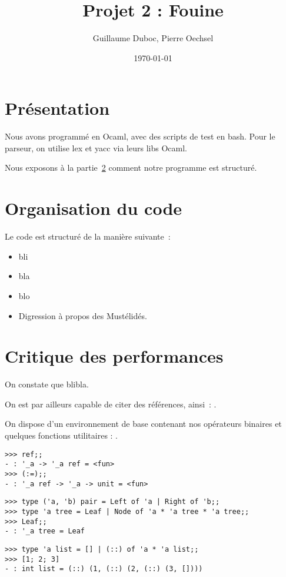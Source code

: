 \documentclass[paper=a4, fontsize=11pt, twocolumn]{article}
\title{Projet 2 : Fouine}
\author{Guillaume Duboc, Pierre Oechsel}
\date{\today}
\begin{document}
\maketitle


\section{Présentation}

Nous avons programmé en Ocaml, avec des scripts de test en bash.
Pour le parseur, on utilise lex et yacc via leurs libs Ocaml.

Nous exposons à la partie~\ref{s:orga} comment notre programme est structuré.


\section{Organisation du code}
\label{s:orga}

Le code est structuré de la manière suivante~:
\begin{itemize}
\item bli
\item bla
\item blo
\item Digression à propos des Mustélidés.
\end{itemize}

\section{Critique des performances}

On constate que blibla.


On est par ailleurs capable de citer des références, ainsi~: \cite{Landin}.



On dispose d'un environnement de base contenant nos opérateurs binaires et quelques fonctions utilitaires : .
\begin{verbatim}
>>> ref;;
- : '_a -> '_a ref = <fun>
>>> (:=);;
- : '_a ref -> '_a -> unit = <fun>
\end{verbatim}

\begin{verbatim}
>>> type ('a, 'b) pair = Left of 'a | Right of 'b;;
>>> type 'a tree = Leaf | Node of 'a * 'a tree * 'a tree;;
>>> Leaf;;
- : '_a tree = Leaf
\end{verbatim}
\begin{verbatim}
>>> type 'a list = [] | (::) of 'a * 'a list;;
>>> [1; 2; 3]
- : int list = (::) (1, (::) (2, (::) (3, [])))
\end{verbatim}
\end{document}
